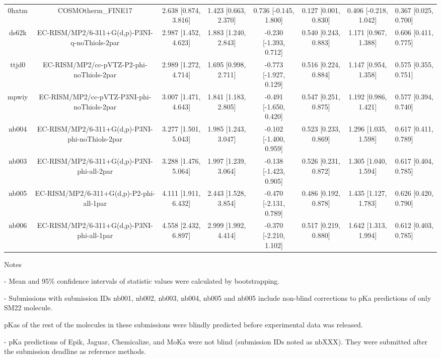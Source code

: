 \documentclass{article}
\begin{document}
\begin{center}
\begin{longtable}{|ccccccc|}
 0hxtm &                                 COSMOtherm\_FINE17 &  2.638 [0.874, 3.816] &  1.423 [0.663, 2.370] &    0.736 [-0.145, 1.800] &  0.127 [0.001, 0.830] &  0.406 [-0.218, 1.042] &   0.367 [0.025, 0.700] \\
 ds62k &      EC-RISM/MP2/6-311+G(d,p)-P3NI-q-noThiols-2par &  2.987 [1.452, 4.623] &  1.883 [1.240, 2.843] &   -0.230 [-1.393, 0.712] &  0.540 [0.243, 0.883] &   1.171 [0.967, 1.388] &   0.606 [0.411, 0.775] \\
 ttjd0 &           EC-RISM/MP2/cc-pVTZ-P2-phi-noThiols-2par &  2.989 [1.272, 4.714] &  1.695 [0.998, 2.711] &   -0.773 [-1.927, 0.129] &  0.516 [0.224, 0.884] &   1.147 [0.954, 1.358] &   0.575 [0.355, 0.751] \\
 mpwiy &         EC-RISM/MP2/cc-pVTZ-P3NI-phi-noThiols-2par &  3.007 [1.471, 4.643] &  1.841 [1.183, 2.805] &   -0.491 [-1.650, 0.420] &  0.547 [0.251, 0.875] &   1.192 [0.986, 1.421] &   0.577 [0.394, 0.740] \\
 nb004 &    EC-RISM/MP2/6-311+G(d,p)-P3NI-phi-noThiols-2par &  3.277 [1.501, 5.043] &  1.985 [1.243, 3.047] &   -0.102 [-1.400, 0.959] &  0.523 [0.233, 0.869] &   1.296 [1.035, 1.598] &   0.617 [0.411, 0.789] \\
 nb003 &         EC-RISM/MP2/6-311+G(d,p)-P3NI-phi-all-2par &  3.288 [1.476, 5.064] &  1.997 [1.239, 3.064] &   -0.138 [-1.423, 0.905] &  0.526 [0.231, 0.872] &   1.305 [1.040, 1.594] &   0.617 [0.404, 0.785] \\
 nb005 &           EC-RISM/MP2/6-311+G(d,p)-P2-phi-all-1par &  4.111 [1.911, 6.432] &  2.443 [1.528, 3.854] &   -0.470 [-2.131, 0.789] &  0.486 [0.192, 0.878] &   1.435 [1.127, 1.783] &   0.626 [0.420, 0.790] \\
 nb006 &         EC-RISM/MP2/6-311+G(d,p)-P3NI-phi-all-1par &  4.558 [2.432, 6.897] &  2.999 [1.992, 4.414] &   -0.370 [-2.210, 1.102] &  0.517 [0.219, 0.880] &   1.642 [1.313, 1.994] &   0.612 [0.403, 0.785] \\
\end{longtable}
\end{center}

Notes

- Mean and 95\% confidence intervals of statistic values were calculated by bootstrapping.

- Submissions with submission IDs nb001, nb002, nb003, nb004, nb005 and nb005 include non-blind corrections to pKa predictions of only SM22 molecule.

pKas of the rest of the molecules in these submissions were blindly predicted before experimental data was released.

- pKa predictions of Epik, Jaguar, Chemicalize, and MoKa were not blind (submission IDs noted as nbXXX). They were submitted after the submission deadline as reference methods.
\end{document}
